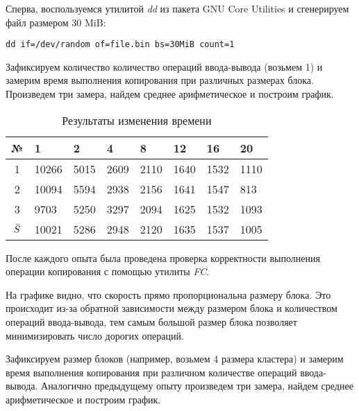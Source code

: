 \documentclass[a4paper,14pt]{extarticle}
\newcommand{\Code}[1]{\textit{#1}}
\begin{document}
Сперва, воспользуемся утилитой \Code{dd} из пакета GNU Core Utilities и
сгенерируем файл размером 30 MiB:
\small%
\begin{verbatim}
dd if=/dev/random of=file.bin bs=30MiB count=1
\end{verbatim}
\normalsize
Зафиксируем количество количество операций ввода-вывода (возьмем 1) и замерим
время выполнения копирования при различных размерах блока. Произведем три
замера, найдем среднее арифметическое и построим график.

\begin{table}[H]
    \centering
    \begin{tabularx}{\textwidth}{|c|X|X|X|X|X|X|X|}
        \hline
                № & 1 & 2 & 4 & 8 & 12 & 16 & 20 \\
        \hline
                1 & 10266 & 5015 & 2609 & 2110 & 1640 & 1532 & 1110 \\
        \hline
                2 & 10094 & 5594 & 2938 & 2156 & 1641 & 1547 & 813  \\
        \hline
                3 & 9703  & 5250 & 3297 & 2094 & 1625 & 1532 & 1093 \\
        \hline
        $\Bar{S}$ & 10021 & 5286 & 2948 & 2120 & 1635 & 1537 & 1005 \\
        \hline
    \end{tabularx}
    \caption{Результаты изменения времени}
\end{table}

После каждого опыта была проведена проверка корректности выполнения операции
копирования с помощью утилиты \Code{FC}.


На графике видно, что скорость прямо пропорциональна размеру блока. Это
происходит из-за обратной зависимости между размером блока и количеством
операций ввода-вывода, тем самым большой размер блока позволяет минимизировать
число дорогих операций.


Зафиксируем размер блоков (например, возьмем 4 размера кластера) и замерим
время выполнения копирования при различном количестве операций ввода-вывода.
Аналогично предыдущему опыту произведем три замера, найдем среднее
арифметическое и построим график.
\end{document}
